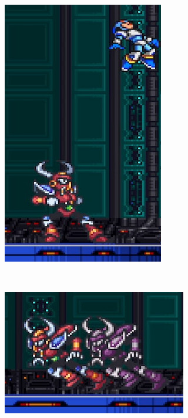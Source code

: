 \begin{figure}[htp]
\begin{subfigure}{0.3\linewidth}
		\includegraphics[width=\linewidth]{figures/X1/Boomer_lift_2.jpg}
		\caption{}
	\end{subfigure}\\
	\begin{subfigure}{0.4\linewidth}
		\centering
		\includegraphics[width=\linewidth]{figures/X1/Boomer_dash.jpg}

\end{subfigure}
\end{figure}
